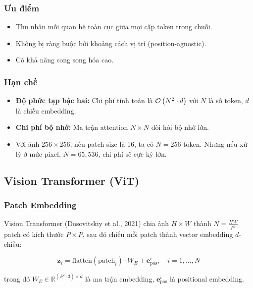 \subsubsection*{Ưu điểm}
\begin{itemize}
    \item Thu nhận mối quan hệ toàn cục giữa mọi cặp token trong chuỗi.
    \item Không bị ràng buộc bởi khoảng cách vị trí (position-agnostic).
    \item Có khả năng song song hóa cao.
\end{itemize}

\subsubsection*{Hạn chế}
\begin{itemize}
    \item \textbf{Độ phức tạp bậc hai:} Chi phí tính toán là $\mathcal{O}\left(N^2 \cdot d\right)$ với $N$ là số token, $d$ là chiều embedding.
    \item \textbf{Chi phí bộ nhớ:} Ma trận attention $N \times N$ đòi hỏi bộ nhớ lớn.
    \item Với ảnh $256 \times 256$, nếu patch size là 16, ta có $N = 256$ token. Nhưng nếu xử lý ở mức pixel, $N = 65{,}536$, chi phí sẽ cực kỳ lớn.
\end{itemize}

\subsection{Vision Transformer (ViT)}
\label{subsec:vit}

\subsubsection*{Patch Embedding}

Vision Transformer \cite{vit2021} (Dosovitskiy et al., 2021) chia ảnh $H \times W$ thành $N = \frac{HW}{P^2}$ patch có kích thước $P \times P$, sau đó chiếu mỗi patch thành vector embedding $d$-chiều:

\begin{equation}
    \mathbf{z}_i = \text{flatten}(\text{patch}_i) \cdot W_E + \mathbf{e}_{\text{pos}}^i, \quad i = 1, \ldots, N
\end{equation}

\noindent trong đó $W_E \in \mathbb{R}^{(P^2 \cdot 3) \times d}$ là ma trận embedding, $\mathbf{e}_{\text{pos}}^i$ là positional embedding.


